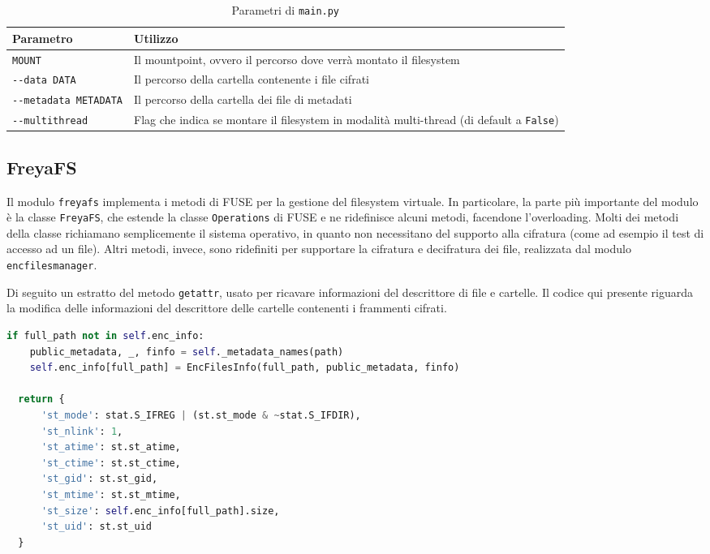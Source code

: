 \documentclass[a4paper,12pt,twoside,openright]{report}
\begin{document}
  \begin{table}[h!]
    \centering
    \begin{tabular}{|p{4.5cm}|p{9.5cm}|} 
      \hline
      Parametro & Utilizzo \\ [0.5ex] 
      \hline\hline
      \texttt{MOUNT} & Il mountpoint, ovvero il percorso dove verrà montato il filesystem \\ 
      \hline
      \texttt{-{}-data DATA} & Il percorso della cartella contenente i file cifrati \\
      \hline
      \texttt{-{}-metadata METADATA} & Il percorso della cartella dei file di metadati \\
      \hline
      \texttt{-{}-multithread} & Flag che indica se montare il filesystem in modalità multi-thread (di default a \texttt{False}) \\
      \hline
    \end{tabular}
    \caption{Parametri di \texttt{main.py}}
    \label{table-main}
  \end{table}
  
  
  \subsection{FreyaFS}

  Il modulo \texttt{freyafs} implementa i metodi di FUSE per la gestione del filesystem virtuale.
  In particolare, la parte più importante del modulo è la classe
  \texttt{FreyaFS}, che estende la classe \texttt{Operations} di FUSE e ne ridefinisce alcuni metodi, facendone
  l'overloading. Molti dei metodi della classe richiamano semplicemente il sistema operativo, in quanto
  non necessitano del supporto alla cifratura (come ad esempio il test di accesso ad un file).
  Altri metodi, invece, sono ridefiniti per supportare la cifratura e decifratura dei file, realizzata
  dal modulo \texttt{encfilesmanager}.

  Di seguito un estratto del metodo \texttt{getattr}, usato per ricavare informazioni del descrittore
  di file e cartelle. Il codice qui presente riguarda la modifica delle informazioni
  del descrittore delle cartelle contenenti i frammenti cifrati.

  \begin{lstlisting}[language=Python]
  if full_path not in self.enc_info:
    public_metadata, _, finfo = self._metadata_names(path)
    self.enc_info[full_path] = EncFilesInfo(full_path, public_metadata, finfo)

  return {
      'st_mode': stat.S_IFREG | (st.st_mode & ~stat.S_IFDIR),
      'st_nlink': 1,
      'st_atime': st.st_atime,
      'st_ctime': st.st_ctime,
      'st_gid': st.st_gid,
      'st_mtime': st.st_mtime,
      'st_size': self.enc_info[full_path].size,
      'st_uid': st.st_uid
  }
  \end{lstlisting}
\end{document}
